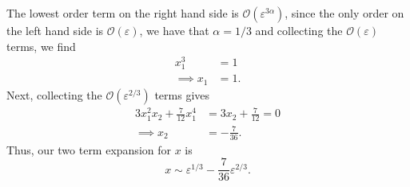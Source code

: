 \documentclass{article}
\begin{document}
\begin{itemize}
\begin{itemize}
        The lowest order term on the right hand side is $\mathcal{O}(\varepsilon^{3\alpha})$, since the only order on the left hand side is $\mathcal{O}(\varepsilon)$, we have that $\alpha = 1/3$ and collecting the $\mathcal{O}(\varepsilon)$ terms, we find
        \begin{align*}
            x_1^3 &= 1\\
            \implies x_1 &= 1.
        \end{align*}
        Next, collecting the $\mathcal{O}(\varepsilon^{2/3})$ terms gives
        \begin{align*}
            3x_1^2x_2 + \frac{7}{12}x_1^4 &= 3x_2 + \frac{7}{12} = 0\\
            \implies x_2 &= -\frac{7}{36}.
        \end{align*}
        Thus, our two term expansion for $x$ is
        \[x \sim \varepsilon^{1/3} - \frac{7}{36}\varepsilon^{2/3}.\]
    \end{itemize}


    \pagebreak



\end{itemize}
\end{document}
